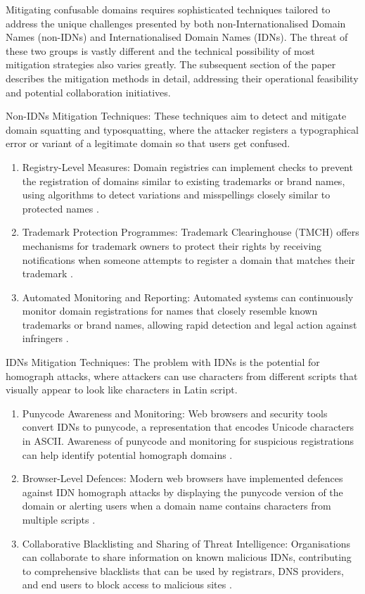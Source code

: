 Mitigating confusable domains requires sophisticated techniques tailored to address the unique challenges presented by both non-Internationalised Domain Names (non-IDNs) and Internationalised Domain Names (IDNs). The threat of these two groups is vastly different and the technical possibility of most mitigation strategies also varies greatly. The subsequent section of the paper describes the mitigation methods in detail, addressing their operational feasibility and potential collaboration initiatives.

Non-IDNs Mitigation Techniques: These techniques aim to detect and mitigate domain squatting and typosquatting, where the attacker registers a typographical error or variant of a legitimate domain so that users get confused.

\begin{enumerate}
  \item Registry-Level Measures: Domain registries can implement checks to prevent the registration of domains similar to existing trademarks or brand names, using algorithms to detect variations and misspellings closely similar to protected names \cite{WTR2020}.
  \item Trademark Protection Programmes: Trademark Clearinghouse (TMCH) offers mechanisms for trademark owners to protect their rights by receiving notifications when someone attempts to register a domain that matches their trademark \cite{ICANNTMCH}.
  \item Automated Monitoring and Reporting: Automated systems can continuously monitor domain registrations for names that closely resemble known trademarks or brand names, allowing rapid detection and legal action against infringers \cite{TMCH2023}.
\end{enumerate}

IDNs Mitigation Techniques: The problem with IDNs is the potential for homograph attacks, where attackers can use characters from different scripts that visually appear to look like characters in Latin script.

\begin{enumerate}
  \item Punycode Awareness and Monitoring: Web browsers and security tools convert IDNs to punycode, a representation that encodes Unicode characters in ASCII. Awareness of punycode and monitoring for suspicious registrations can help identify potential homograph domains \cite{SOCRadar2023}.
  \item Browser-Level Defences: Modern web browsers have implemented defences against IDN homograph attacks by displaying the punycode version of the domain or alerting users when a domain name contains characters from multiple scripts \cite{Malwarebytes2017}.
  \item Collaborative Blacklisting and Sharing of Threat Intelligence: Organisations can collaborate to share information on known malicious IDNs, contributing to comprehensive blacklists that can be used by registrars, DNS providers, and end users to block access to malicious sites \cite{CyberThreatAlliance2023}.
  
\end{enumerate}


